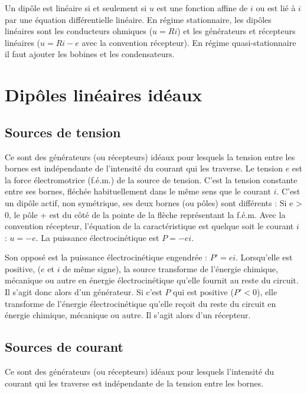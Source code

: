 Un dipôle est linéaire si et seulement si $u$ est une fonction affine de $i$ ou est lié à $i$ par une équation différentielle linéaire. En régime stationnaire, les dipôles linéaires sont les conducteurs ohmiques ($u = R i$) et les générateurs et récepteurs linéaires ($u = R i - e$ avec la convention récepteur). En régime quasi-stationnaire il faut ajouter les bobines et les condensateurs.

\section{Dipôles linéaires idéaux}
\subsection{Sources de tension}

Ce sont des générateurs (ou récepteurs) idéaux pour lesquels la tension entre les bornes est indépendante de l'intensité du courant qui les traverse. Le tension $e$ est la force électromotrice (f.é.m.) de la source de tension. C'est la tension constante entre ses bornes, fléchée habituellement dans le même sens que le courant $i$. C'est un dipôle actif, non symétrique, ses deux bornes (ou pôles) sont différents : Si e > 0, le pôle + est du côté de la pointe de la flèche représentant la f.é.m. Avec la convention récepteur, l'équation de la caractéristique est quelque soit le courant $i$ : $u=-e$. La puissance électrocinétique est $P=-ei$. 

Son opposé est la puissance électrocinétique engendrée : $P' = e i$. Lorsqu'elle est positive, ($e$ et $i$ de même signe), la source transforme de l'énergie chimique, mécanique ou autre en énergie électrocinétique qu'elle fournit au reste du circuit. Il s'agit donc alors d'un générateur. Si c'est $P$ qui est positive ($P ' < 0$), elle transforme de l'énergie électrocinétique qu'elle reçoit du reste du circuit en énergie chimique, mécanique ou autre. Il s'agit alors d'un récepteur.

\subsection{Sources de courant}

Ce sont des générateurs (ou récepteurs) idéaux pour lesquels l'intensité du courant qui les traverse est indépendante de la tension entre les bornes.

